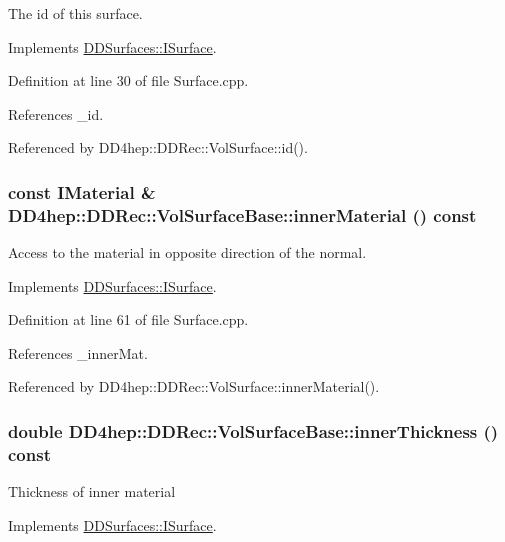 The id of this surface. 

Implements \hyperlink{class_d_d_surfaces_1_1_i_surface_aaf7bf967d4a0652c620ec9754a2b37c1}{DDSurfaces::ISurface}.

Definition at line 30 of file Surface.cpp.

References \_\-id.

Referenced by DD4hep::DDRec::VolSurface::id().\hypertarget{class_d_d4hep_1_1_d_d_rec_1_1_vol_surface_base_a55f7258fad63f0224e7f5db301596baf}{
\subsubsection[{innerMaterial}]{\setlength{\rightskip}{0pt plus 5cm}const {\bf IMaterial} \& DD4hep::DDRec::VolSurfaceBase::innerMaterial () const}}
\label{class_d_d4hep_1_1_d_d_rec_1_1_vol_surface_base_a55f7258fad63f0224e7f5db301596baf}


Access to the material in opposite direction of the normal. 

Implements \hyperlink{class_d_d_surfaces_1_1_i_surface_a18942d2f0ea7478506765a50fa44d5e3}{DDSurfaces::ISurface}.

Definition at line 61 of file Surface.cpp.

References \_\-innerMat.

Referenced by DD4hep::DDRec::VolSurface::innerMaterial().\hypertarget{class_d_d4hep_1_1_d_d_rec_1_1_vol_surface_base_ad47a7a1236d529ba5263bc5bf9bd3fbc}{
\subsubsection[{innerThickness}]{\setlength{\rightskip}{0pt plus 5cm}double DD4hep::DDRec::VolSurfaceBase::innerThickness () const}}
\label{class_d_d4hep_1_1_d_d_rec_1_1_vol_surface_base_ad47a7a1236d529ba5263bc5bf9bd3fbc}
Thickness of inner material 

Implements \hyperlink{class_d_d_surfaces_1_1_i_surface_ab6913582dd6c1f44df2038705ce2aea6}{DDSurfaces::ISurface}.

